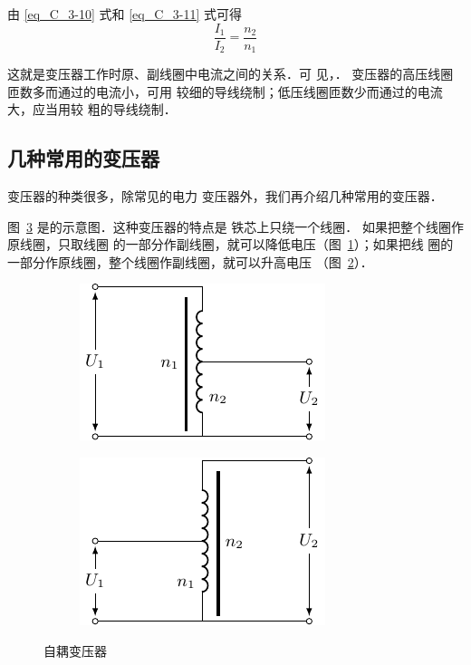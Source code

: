由 \eqref{eq_C_3-10} 式和 \eqref{eq_C_3-11} 式可得
\begin{equation}\label{eq_C_3-12}
    \frac{I_1}{I_2}=\frac{n_2}{n_1}
\end{equation}

这就是变压器工作时原、副线圈中电流之间的关系．可
见，．
变压器的高压线圈匝数多而通过的电流小，可用
较细的导线绕制；低压线圈匝数少而通过的电流大，应当用较
粗的导线绕制．

\subsection{几种常用的变压器}

变压器的种类很多，除常见的电力
变压器外，我们再介绍几种常用的变压器．

图~\ref{fig_C_3-26} 是的示意图．这种变压器的特点是
铁芯上只绕一个线圈．
如果把整个线圈作原线圈，只取线圈
的一部分作副线圈，就可以降低电压（图~\ref{fig_C_3-26a}）；如果把线
圈的一部分作原线圈，整个线圈作副线圈，就可以升高电压
（图~\ref{fig_C_3-26b}）．
\begin{figure}[htbp]
    \centering
    \begin{subfigure}{0.4\linewidth}
        \centering
        \includegraphics{fig/C/3-26a.pdf}
        \caption{}\label{fig_C_3-26a}
    \end{subfigure}
    \hfil
    \begin{subfigure}{0.4\linewidth}
        \centering
        \includegraphics{fig/C/3-26b.pdf}
        \caption{}\label{fig_C_3-26b}
    \end{subfigure}
    \caption{自耦变压器}\label{fig_C_3-26}
\end{figure}

